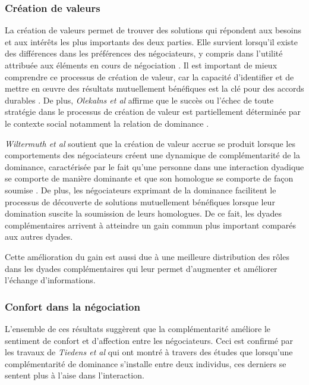 	
		\subsubsection*{Création de valeurs}
		
	La création de valeurs permet de trouver des solutions qui répondent aux besoins et aux intérêts les plus importants des deux parties. Elle survient lorsqu'il existe des différences dans les préférences des négociateurs, y compris dans l'utilité attribuée  aux éléments en cours de négociation \cite{lax1986managerial}. 
	Il est important de mieux comprendre ce processus de création de valeur, car la capacité d'identifier et de mettre en œuvre des résultats mutuellement bénéfiques est la clé pour des accords durables \cite{wiltermuth2015benefits}.
	De plus, \emph{Olekalns et al} affirme que le succès ou l'échec de toute stratégie dans le processus de création de valeur est partiellement déterminée par le contexte social notamment la relation de dominance \cite{olekalns2013dyadic}.
	
	\emph{Wiltermuth et al} soutient que la création de valeur accrue se produit lorsque les comportements des négociateurs créent une dynamique de complémentarité de la dominance, caractérisée par le fait qu'une personne dans une interaction dyadique se comporte de manière dominante et que son homologue se comporte de façon soumise \cite{wiltermuth2015benefits}. De plus, les négociateurs exprimant de la dominance facilitent le processus de découverte de solutions mutuellement bénéfiques lorsque leur domination suscite la soumission de leurs homologues. De ce fait, les dyades complémentaires arrivent à atteindre un gain commun plus important comparés aux autres dyades.
	
	Cette amélioration du gain est aussi due à une meilleure distribution des rôles dans les dyades complémentaires qui leur permet d'augmenter et améliorer l'échange d'informations. 
		\subsubsection*{Confort dans la négociation}
	L'ensemble de ces résultats suggèrent que la complémentarité améliore le sentiment de confort et d'affection entre les négociateurs. Ceci est confirmé par les travaux de \emph{Tiedens et al} \cite{tiedens2003power} qui ont montré à travers des études que lorsqu'une complémentarité de dominance s'installe entre deux individus, ces derniers se sentent plus à l'aise dans l'interaction. 
	
